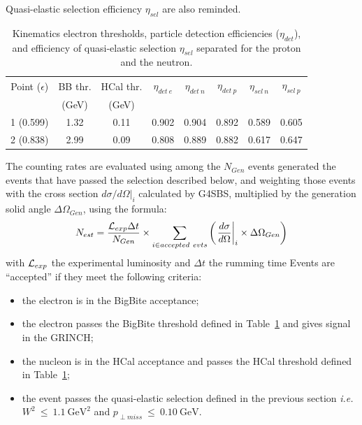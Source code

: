 Quasi-elastic selection efficiency $\eta_{sel}$ are also reminded.
%
\begin{center}
\begin{table}[h]
\begin{tabular}{|c|c|c|c|c|c|c|c|}
\hline
Point ($\epsilon$) & BB thr. & HCal thr. & $\eta_{det~e}$ & $\eta_{det~n}$ & $\eta_{det~p}$ & $\eta_{sel~n}$ & $\eta_{sel~p}$ \\
 & (GeV) & (GeV) &  &  &  &  &  \\
\hline
1 (0.599) & 1.32 & 0.11 & 0.902 & 0.904 & 0.892 & 0.589 & 0.605 \\ 
\hline
2 (0.838) & 2.99 & 0.09 & 0.808 & 0.889 & 0.882 & 0.617 & 0.647 \\
\hline
\end{tabular} 
\caption{Kinematics electron thresholds, particle detection efficiencies ($\eta_{det}$), and efficiency of quasi-elastic selection $\eta_{sel}$ separated for the proton and the neutron.}
\label{tab:kinEffs}
\end{table}
\end{center}
%

The counting rates are evaluated using among the $N_{Gen}$ events generated the events that have passed the selection described below, and weighting those events with the cross section ${d\sigma}/{d\Omega}|_i$ calculated by G4SBS, multiplied by the generation solid angle $\Delta\Omega_{Gen}$, using the formula:
%
\begin{equation}
  N_{est} = \frac{{\cal L}_{exp} \Delta t}{N_{Gen}} \times \sum_{i \in accepted~evts}\left( \left. \frac{d\sigma}{d\Omega}\right|_i \times \Delta\Omega_{Gen} \right)
\end{equation}
%
with ${\cal L}_{exp}$ the experimental luminosity and $\Delta t$ the rumming time
Events are ``accepted'' if they meet the following criteria:
%
\begin{itemize}
\item{the electron is in the BigBite acceptance};
\item{the electron passes the BigBite threshold defined in Table~\ref{tab:kinEffs} and gives signal in the GRINCH;}
\item{the nucleon is in the HCal acceptance and passes the HCal threshold defined in Table~\ref{tab:kinEffs};}
\item{the event passes the quasi-elastic selection defined in the previous section {\it i.e.} $W^2~\leq~1.1~\mathrm{GeV}^2$ and $p_{\perp miss}~\leq~0.10~\mathrm{GeV}$.} 
\end{itemize}
%

